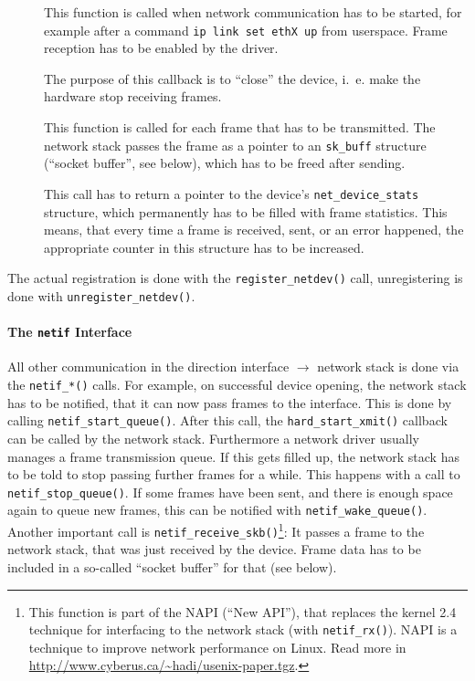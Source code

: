 \documentclass[a4paper,12pt,BCOR6mm,bibtotoc,idxtotoc]{scrbook}
\begin{document}
\begin{description}

\item[\usebox\boxopen] This function is called when network communication has
to be started, for example after a command \lstinline+ip link set ethX up+
from userspace. Frame reception has to be enabled by the driver.

\item[\usebox\boxstop] The purpose of this callback is to ``close'' the device,
i.~e.  make the hardware stop receiving frames.

\item[\usebox\boxxmit] This function is called for each frame that has to be
transmitted. The network stack passes the frame as a pointer to an
\lstinline+sk_buff+ structure (``socket buffer'', see
below), which has to be freed after sending.

\item[\usebox\boxstats] This call has to return a pointer to the device's
\lstinline+net_device_stats+ structure, which permanently has to be filled with
frame statistics. This means, that every time a frame is received, sent, or an
error happened, the appropriate counter in this structure has to be increased.

\end{description}

The actual registration is done with the \lstinline+register_netdev()+ call,
unregistering is done with \lstinline+unregister_netdev()+.

\paragraph{The \lstinline+netif+ Interface}

All other communication in the direction interface $\to$ network stack is done
via the \lstinline+netif_*()+ calls. For example, on successful device opening,
the network stack has to be notified, that it can now pass frames to the
interface. This is done by calling \lstinline+netif_start_queue()+. After this
call, the \lstinline+hard_start_xmit()+ callback can be called by the network
stack. Furthermore a network driver usually manages a frame transmission queue.
If this gets filled up, the network stack has to be told to stop passing
further frames for a while. This happens with a call to
\lstinline+netif_stop_queue()+. If some frames have been sent, and there is
enough space again to queue new frames, this can be notified with
\lstinline+netif_wake_queue()+. Another important call is
\lstinline+netif_receive_skb()+\footnote{This function is part of the NAPI
(``New API''), that replaces the kernel 2.4 technique for interfacing to the
network stack (with \lstinline+netif_rx()+). NAPI is a technique to improve
network performance on Linux. Read more in
\url{http://www.cyberus.ca/~hadi/usenix-paper.tgz}.}: It passes a frame to the
network stack, that was just received by the device. Frame data has to be
included in a so-called ``socket buffer'' for that (see below).
\end{document}
